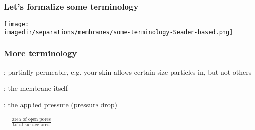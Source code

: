 \begin{frame}\frametitle{Let's formalize some terminology}
	
	\begin{center}
		\texttt{[image: \\imagedir/separations/membranes/some-terminology-Seader-based.png]}
	\end{center}
\end{frame}

\begin{frame}\frametitle{More terminology}
	
	{\color{purple}{semipermeable}}: partially permeable, e.g. your skin allows certain size particles in, but not others

	\vspace{12pt}
	{\color{purple}{mass separating agent}}: the membrane itself
	
	\vspace{12pt}	
	{\color{purple}{energy separating agent}}: the applied pressure (pressure drop)
	
	\vspace{12pt}
	{\color{purple}{porosity}} = $\displaystyle \frac{\text{area of open pores}}{\text{total surface area}}$ 
\end{frame}

